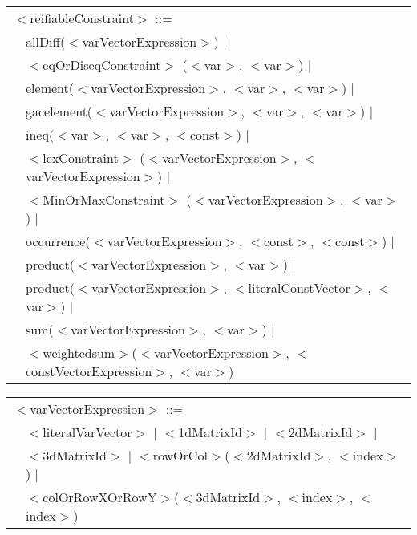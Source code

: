 \documentclass{article}
\begin{document}
\begin{small}
\begin{tabular}{ll}
\end{tabular}
\vspace*{1mm}

\noindent
\setlength{\tabcolsep}{0mm}
\begin{tabular}{ll}
\multicolumn{2}{l}{$<$reifiableConstraint$>$ ::=}\\
\hspace*{2mm}              & allDiff($<$varVectorExpression$>$) $|$\\
             & $<$eqOrDiseqConstraint$>$ ($<$var$>$, $<$var$>$) $|$\\
              & element($<$varVectorExpression$>$, $<$var$>$, $<$var$>$) $|$\\
              & gacelement($<$varVectorExpression$>$, $<$var$>$, $<$var$>$) $|$\\
              & ineq($<$var$>$, $<$var$>$, $<$const$>$) $|$\\
              & $<$lexConstraint$>$ ($<$varVectorExpression$>$, $<$varVectorExpression$>$) $|$\\
              & $<$MinOrMaxConstraint$>$ ($<$varVectorExpression$>$, $<$var$>$) $|$\\
              & occurrence($<$varVectorExpression$>$, $<$const$>$, $<$const$>$) $|$\\ 
              & product($<$varVectorExpression$>$, $<$var$>$) $|$\\
              & product($<$varVectorExpression$>$, $<$literalConstVector$>$, $<$var$>$) $|$\\
              & sum($<$varVectorExpression$>$, $<$var$>$) $|$ \\
              & $<$weightedsum$>$($<$varVectorExpression$>$, $<$constVectorExpression$>$, $<$var$>$)  
\end{tabular}

\noindent
\setlength{\tabcolsep}{0mm}
\begin{tabular}{ll}
\multicolumn{2}{l}{$<$varVectorExpression$>$ ::=}\\
\hspace*{2mm} & $<$literalVarVector$>$ $|$ $<$1dMatrixId$>$ $|$ $<$2dMatrixId$>$ $|$\\
              & $<$3dMatrixId$>$ $|$ $<$rowOrCol$>$($<$2dMatrixId$>$, $<$index$>$) $|$\\
              & $<$colOrRowXOrRowY$>$($<$3dMatrixId$>$, $<$index$>$, $<$index$>$)
\end{tabular}


\end{small}
\end{document}
